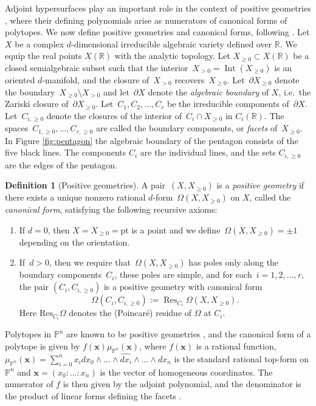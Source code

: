 \documentclass[12pt]{extarticle}
\theoremstyle{definition}
\newtheorem{definition}[theorem]{Definition}
\begin{document}
Adjoint hypersurfaces play an important role in the context of positive geometries \cite{arkani2017positive}, where their defining polynomials arise as numerators of canonical forms of polytopes. We now define positive geometries and canonical forms, following \cite{Lam:2022yly}. Let $X$ be a complex $d$-dimensional irreducible algebraic variety defined over $\mathbb{R}$. We equip the real points $X(\mathbb{R})$ with the analytic topology. Let $X_{\geq 0} \subset X(\mathbb{R})$ be a closed semialgebraic subset such that the interior~$X_{>0} = \operatorname{Int}(X_{\geq 0})$ is an oriented $d$-manifold, and the closure of~$X_{>0}$ recovers~$X_{\geq 0}$. Let~$\partial X_{\geq 0}$ denote the boundary~$X_{\geq 0} \setminus X_{>0}$ and let~$\partial X$ denote the \emph{algebraic boundary} of $X$, i.e.\ the Zariski closure of~$\partial X_{\geq 0}$. Let~$C_1, C_2,\ldots, C_r$ be the irreducible components of~$\partial X$. Let~$C_{i,\geq 0}$ denote the closures of the interior of~$C_i \cap X_{\geq 0}$ in $C_i(\mathbb{R})$.
The spaces~$C_{1,\geq 0},\ldots, C_{r,\geq 0}$ are called the boundary components, or \emph{facets} of~$X_{\geq 0}$. In Figure \ref{fig:pentagon} the algebraic boundary of the pentagon consists of the five black lines. The components $C_i$ are the individual lines, and the sets $C_{i,\geq 0}$ are the edges of the pentagon. 

\begin{definition}[Positive geometries] \label{def:posgeo}
    A pair~$(X,X_{\geq 0})$ is a \emph{positive geometry} if there exists a unique nonzero rational $d$-form~$\Omega (X,X_{\geq 0})$ on $X$, called the \emph{canonical form}, satisfying the following recursive axioms:
    \begin{enumerate}
        \item If $d = 0$, then $X = X_{\geq 0} = \mathrm{pt}$ is a point and we define~$\Omega(X,X_{\geq 0}) = \pm 1$ depending on the orientation.
        \item If~$d > 0$, then we require that~$\Omega (X, X_{\geq 0})$ has poles only along the boundary components~$C_i$, these poles are simple, and for each~$i = 1, 2,\ldots, r,$ the pair $(C_i, C_{i,\geq 0})$ is a positive geometry with canonical form 
        $$\Omega(C_i, C_{i,\geq 0}):=\operatorname{Res}_{C_i} \Omega(X, X_{\geq 0}).$$ Here $\mathrm{Res}_{C_i}\Omega$ denotes the (Poincar\'e) residue of $\Omega$ at $C_i$. 
    \end{enumerate}
\end{definition}

Polytopes in $\mathbb{P}^n$ are known to be positive geometries \cite[Section 5]{arkani2017positive}, and the canonical form of a polytope is given by $f(\mathbf{x})\mu_{\mathbb{P}^n}(\mathbf{x})$, where $f(\mathbf{x})$ is a rational function, $\mu_{\mathbb{P}^n}(\mathbf{x}) = \sum_{i=0}^n x_i dx_0\wedge\ldots\wedge \widehat{d x_i} \wedge\ldots\wedge dx_n$ is the standard rational top-form on $\mathbb{P}^n$ and $\mathbf{x} = (x_0:\ldots:x_n)$ is the vector of homogeneous coordinates. The numerator of $f$ is then given by the adjoint polynomial, and the denominator is the product of linear forms defining the facets \cite[Theorem 5]{Lam:2022yly}.
\end{document}
